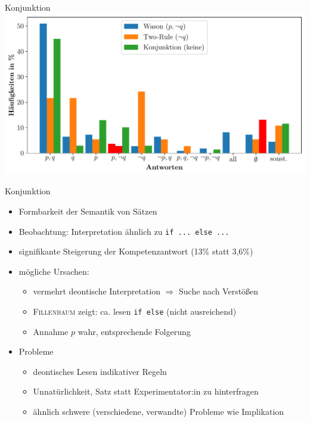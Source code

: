 \begin{frame}{Konjunktion {\scriptsize \cite[S.~109]{stenningHumanReasoningCognitive2008}}}
    \includegraphics[width=\textwidth]{../plot/results_conjunction.pdf}
\end{frame}


\begin{frame}{Konjunktion {\scriptsize \cite[S.~107-109]{stenningHumanReasoningCognitive2008}}}
    \begin{itemize}
        \item Formbarkeit der Semantik von Sätzen
        \item Beobachtung: Interpretation ähnlich zu \texttt{if ... else ...}
        \item signifikante Steigerung der Kompetenzantwort {\small (13\% statt 3,6\%)}
        
        \pause
        \item mögliche Ursachen:
        \begin{itemize}
            \item vermehrt deontische Interpretation $\Rightarrow$ Suche nach Verstößen
            \item \textsc{Fillenbaum} zeigt: ca.  lesen \texttt{if else} {\small (nicht ausreichend)}
            \item Annahme $p$ wahr, entsprechende Folgerung
        \end{itemize}
        
        \pause
        \item Probleme
        \begin{itemize}
            \item deontisches Lesen indikativer Regeln
            \item Unnatürlichkeit, Satz statt Experimentator:in zu hinterfragen
            \item ähnlich schwere (verschiedene, verwandte) Probleme wie Implikation
        \end{itemize}
    \end{itemize}
\end{frame}


